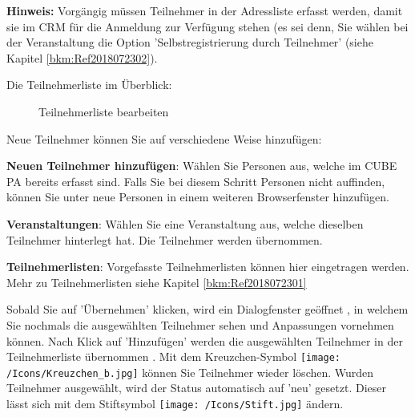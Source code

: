 \textbf{Hinweis:} Vorgängig müssen Teilnehmer in der Adressliste erfasst werden, damit sie im CRM für die Anmeldung zur Verfügung stehen (es sei denn, Sie wählen bei der Veranstaltung die Option 'Selbstregistrierung durch Teilnehmer' (siehe Kapitel \ref{bkm:Ref2018072302}).

\vspace{\baselineskip}

Die Teilnehmerliste im Überblick:

\begin{figure}[H]
\caption{Teilnehmerliste bearbeiten}
\end{figure}

Neue Teilnehmer können Sie auf verschiedene Weise hinzufügen:
\begin{compactitem}
	\item \textbf{Neuen Teilnehmer hinzufügen}: Wählen Sie Personen aus, welche im CUBE PA bereits erfasst sind. Falls Sie bei diesem Schritt Personen nicht auffinden, können Sie unter  neue Personen in einem weiteren Browserfenster hinzufügen.
	\item \textbf{Veranstaltungen}: Wählen Sie eine Veranstaltung aus, welche dieselben Teilnehmer hinterlegt hat. Die Teilnehmer werden übernommen.
	\item \textbf{Teilnehmerlisten}: Vorgefasste Teilnehmerlisten können hier eingetragen werden. Mehr zu Teilnehmerlisten siehe Kapitel \ref{bkm:Ref2018072301}
\end{compactitem}
Sobald Sie auf 'Übernehmen' klicken, wird ein Dialogfenster geöffnet , in welchem Sie nochmals die ausgewählten Teilnehmer sehen und Anpassungen vornehmen können. Nach Klick auf 'Hinzufügen' werden die ausgewählten Teilnehmer in der Teilnehmerliste übernommen . Mit dem Kreuzchen-Symbol \texttt{[image: /Icons/Kreuzchen\_b.jpg]}  können Sie Teilnehmer wieder löschen. Wurden Teilnehmer ausgewählt, wird der Status automatisch auf 'neu' gesetzt. Dieser lässt sich mit dem Stiftsymbol \texttt{[image: /Icons/Stift.jpg]} ändern.\\

